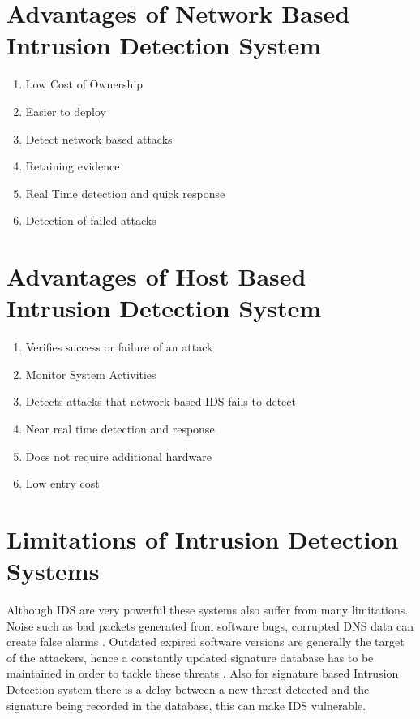 \documentclass[12pt, a4paper]{report}
\begin{document}
\section{Advantages of Network Based Intrusion Detection System}\label{sec:advantagesofNIDS}
\begin{enumerate}
	\item {Low Cost of Ownership}
	\item {Easier to deploy}
	\item {Detect network based attacks}
	\item {Retaining evidence}
	\item {Real Time detection and quick response}
	\item {Detection of failed attacks}
\end{enumerate}

\section{Advantages of Host Based Intrusion Detection System} \label{sec:advantagesHostBasedIDS}
\begin{enumerate}
	\item{Verifies success or failure of an attack}
	\item{Monitor System Activities}
	\item{Detects attacks that network based IDS fails to detect}
	\item{Near real time detection and response}
	\item{Does not require additional hardware}
	\item{Low entry cost}
\end{enumerate}


\section{Limitations of Intrusion Detection Systems}\label{sec:limitsofIDS}

Although IDS are very powerful these systems also suffer from many limitations. Noise such as bad packets generated from software bugs, corrupted DNS data can create false alarms \cite{securityengineering}. Outdated expired software versions are generally the target of the attackers, hence a constantly updated signature database has to be maintained in order to tackle these threats \cite{securityengineering}. Also for signature based Intrusion Detection system there is a delay between a new threat detected and the signature being recorded in the database, this can make IDS vulnerable. \\ \par
\end{document}
